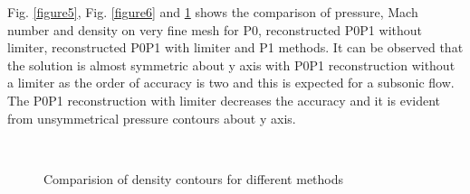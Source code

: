 \documentclass[12pt]{elsarticle}
\begin{document}
	Fig. \ref{figure5}, Fig. \ref{figure6} and \ref{figure4} shows the comparison of pressure, Mach number and density on very fine mesh for P0, reconstructed P0P1 without limiter, reconstructed P0P1 with limiter and P1 methods. It can be observed that the solution is almost symmetric about y axis with P0P1 reconstruction without a limiter as the order of accuracy is two and this is expected for a subsonic flow. The P0P1 reconstruction with limiter decreases the accuracy and it is evident from unsymmetrical pressure contours about y axis. 
	\begin{figure}[ht]
		\centering
		\\
		\caption{Comparision of density contours for different methods}
		\label{figure4}
	\end{figure}
	
\end{document}
